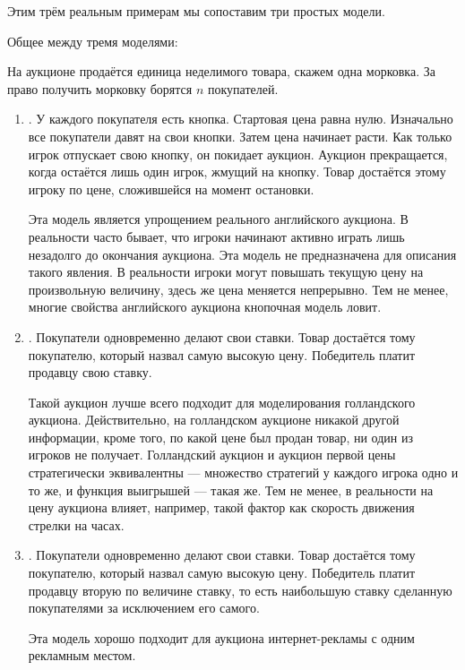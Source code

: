 \begin{itemize}
\end{itemize}

Этим трём реальным примерам мы сопоставим три простых модели.


Общее между тремя моделями:

На аукционе продаётся единица неделимого товара, скажем одна морковка. За право получить морковку борятся $ n $ покупателей.




\begin{enumerate}
\item {}. У каждого покупателя есть кнопка. Стартовая цена равна нулю. Изначально все покупатели давят на свои кнопки. Затем цена начинает расти. Как только игрок отпускает свою кнопку, он покидает аукцион. Аукцион прекращается, когда остаётся лишь один игрок, жмущий на кнопку. Товар достаётся этому игроку по цене, сложившейся на момент остановки.

Эта модель является упрощением реального английского аукциона. В реальности часто бывает, что игроки начинают активно играть лишь незадолго до окончания аукциона. Эта модель не предназначена для описания такого явления. В реальности игроки могут повышать текущую цену на произвольную величину, здесь же цена меняется непрерывно. Тем не менее, многие свойства английского аукциона кнопочная модель ловит.

\item {}. Покупатели одновременно делают свои ставки. Товар достаётся тому покупателю, который назвал самую высокую цену. Победитель платит продавцу свою ставку.

Такой аукцион лучше всего подходит для моделирования голландского аукциона. Действительно, на голландском аукционе никакой другой информации, кроме того, по какой цене был продан товар, ни один из игроков не получает. Голландский аукцион и аукцион первой цены стратегически эквивалентны — множество стратегий у каждого игрока одно и то же, и функция выигрышей — такая же. Тем не менее, в реальности на цену аукциона влияет, например, такой фактор как скорость движения стрелки на часах.
\item {}. Покупатели одновременно делают свои ставки. Товар достаётся тому покупателю, который назвал самую высокую цену. Победитель платит продавцу вторую по величине ставку, то есть наибольшую ставку сделанную покупателями за исключением его самого.

Эта модель хорошо подходит для аукциона интернет-рекламы с одним рекламным местом.
\end{enumerate}

